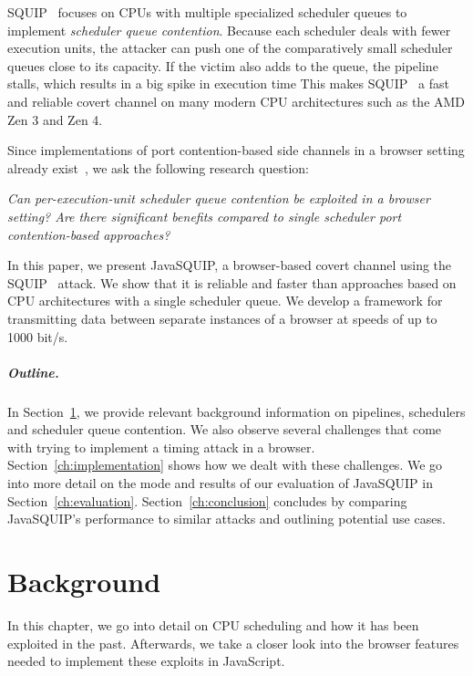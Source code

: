 \documentclass[11pt,
  titlepage=false,
]{scrreprt}
\begin{document}
SQUIP~\cite{squip} focuses on CPUs with multiple specialized scheduler queues to implement \textit{scheduler queue contention}.
Because each scheduler deals with fewer execution units, the attacker can push one of the comparatively small scheduler queues close to its capacity.
If the victim also adds to the queue, the pipeline stalls, which results in a big spike in execution time
This makes SQUIP~\cite{squip} a fast and reliable covert channel on many modern CPU architectures such as the AMD Zen 3 and Zen 4.

Since implementations of port contention-based side channels in a browser setting already exist~\cite{Rokicki2022webport}, we ask the following research question:

\textit{Can per-execution-unit scheduler queue contention be exploited in a browser setting? Are there significant benefits compared to single scheduler port contention-based approaches?}

In this paper, we present JavaSQUIP, a browser-based covert channel using the SQUIP~\cite{squip} attack.
We show that it is reliable and faster than approaches based on CPU architectures with a single scheduler queue.
We develop a framework for transmitting data between separate instances of a browser at speeds of up to 1000 bit/s.

\paragraph{Outline.}
In Section~\ref{ch:background}, we provide relevant background information on pipelines, schedulers and scheduler queue contention.
We also observe several challenges that come with trying to implement a timing attack in a browser.
Section~\ref{ch:implementation} shows how we dealt with these challenges.
We go into more detail on the mode and results of our evaluation of JavaSQUIP in Section~\ref{ch:evaluation}.
Section~\ref{ch:conclusion} concludes by comparing JavaSQUIP's performance to similar attacks and outlining potential use cases.



\chapter{Background}
\label{ch:background}

In this chapter, we go into detail on CPU scheduling and how it has been exploited in the past.
Afterwards, we take a closer look into the browser features needed to implement these exploits in JavaScript.
\end{document}
